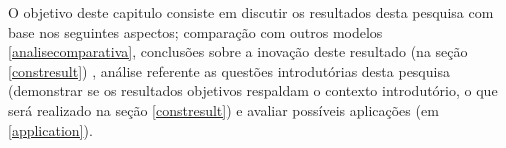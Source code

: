 O objetivo deste capitulo consiste em discutir os resultados desta pesquisa com base nos seguintes aspectos; comparação com outros modelos 
\ref{analisecomparativa}, conclusões sobre a inovação deste resultado (na seção \ref{constresult}) , análise referente as questões introdutórias 
desta pesquisa (demonstrar se os resultados objetivos respaldam o contexto introdutório, o que será realizado na seção \ref{constresult}) e 
avaliar possíveis aplicações (em \ref{application}). 